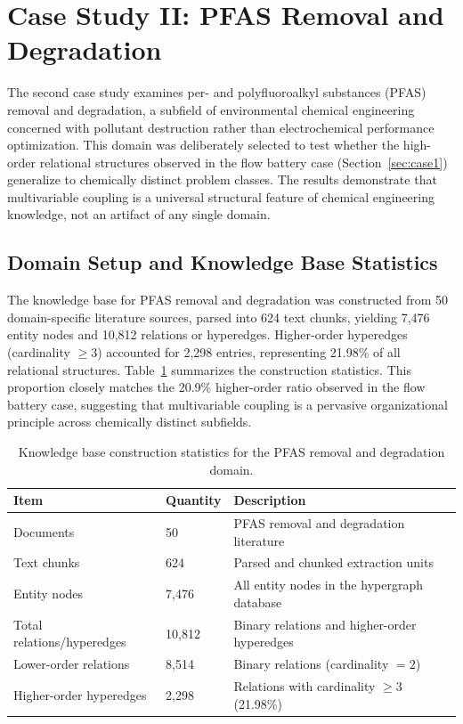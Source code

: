 \section{Case Study II: PFAS Removal and Degradation}
\label{sec:case2}

The second case study examines per- and polyfluoroalkyl substances (PFAS) removal and degradation, a subfield of environmental chemical engineering concerned with pollutant destruction rather than electrochemical performance optimization. This domain was deliberately selected to test whether the high-order relational structures observed in the flow battery case (Section~\ref{sec:case1}) generalize to chemically distinct problem classes. The results demonstrate that multivariable coupling is a universal structural feature of chemical engineering knowledge, not an artifact of any single domain.

\subsection{Domain Setup and Knowledge Base Statistics}

The knowledge base for PFAS removal and degradation was constructed from 50 domain-specific literature sources, parsed into 624 text chunks, yielding 7,476 entity nodes and 10,812 relations or hyperedges. Higher-order hyperedges (cardinality $\geq 3$) accounted for 2,298 entries, representing 21.98\% of all relational structures. Table~\ref{tab:pfas_kb_stats} summarizes the construction statistics. This proportion closely matches the 20.9\% higher-order ratio observed in the flow battery case, suggesting that multivariable coupling is a pervasive organizational principle across chemically distinct subfields.

\begin{table}[htbp]
\centering
\caption{Knowledge base construction statistics for the PFAS removal and degradation domain.}
\label{tab:pfas_kb_stats}
\begin{tabular}{@{}lll@{}}
\toprule
\textbf{Item} & \textbf{Quantity} & \textbf{Description} \\
\midrule
Documents & 50 & PFAS removal and degradation literature \\
Text chunks & 624 & Parsed and chunked extraction units \\
Entity nodes & 7,476 & All entity nodes in the hypergraph database \\
Total relations/hyperedges & 10,812 & Binary relations and higher-order hyperedges \\
Lower-order relations & 8,514 & Binary relations (cardinality $= 2$) \\
Higher-order hyperedges & 2,298 & Relations with cardinality $\geq 3$ (21.98\%) \\
\bottomrule
\end{tabular}
\end{table}

